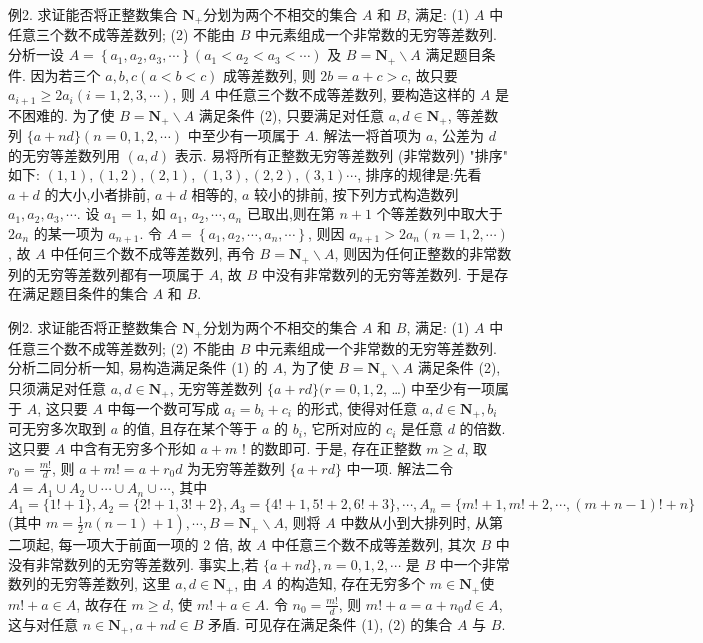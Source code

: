 例2. 求证能否将正整数集合 $\mathbf{N}_{+}$分划为两个不相交的集合 $A$ 和 $B$, 满足:
(1) $A$ 中任意三个数不成等差数列;
(2) 不能由 $B$ 中元素组成一个非常数的无穷等差数列.
分析一设 $A=\left\{a_1, a_2, a_3, \cdots\right\}\left(a_1<a_2<a_3<\cdots\right)$ 及 $B=\mathbf{N}_{+} \backslash A$ 满足题目条件.
因为若三个 $a, b, c(a<b<c)$ 成等差数列, 则 $2 b=a+c>c$, 故只要 $a_{i+1} \geqslant 2 a_i(i=1,2,3, \cdots)$, 则 $A$ 中任意三个数不成等差数列, 要构造这样的 $A$ 是不困难的.
为了使 $B=\mathbf{N}_{+} \backslash A$ 满足条件 (2), 只要满足对任意 $a, d \in \mathbf{N}_{+}$, 等差数列 $\{a+n d\}(n=0,1,2, \cdots)$ 中至少有一项属于 $A$.
解法一将首项为 $a$, 公差为 $d$ 的无穷等差数列用 $(a, d)$ 表示.
易将所有正整数无穷等差数列 (非常数列) "排序" 如下: $(1,1),(1,2),(2,1)$, $(1,3),(2,2),(3,1) \cdots$, 排序的规律是:先看 $a+d$ 的大小,小者排前, $a+d$ 相等的, $a$ 较小的排前, 按下列方式构造数列 $a_1, a_2, a_3, \cdots$. 设 $a_1=1$, 如 $a_1$, $a_2, \cdots, a_n$ 已取出,则在第 $n+1$ 个等差数列中取大于 $2 a_n$ 的某一项为 $a_{n+1}$.
令 $A=\left\{a_1, a_2, \cdots, a_n, \cdots\right\}$, 则因 $a_{n+1}>2 a_n(n=1,2, \cdots)$, 故 $A$ 中任何三个数不成等差数列, 再令 $B=\mathbf{N}_{+} \backslash A$, 则因为任何正整数的非常数列的无穷等差数列都有一项属于 $A$, 故 $B$ 中没有非常数列的无穷等差数列.
于是存在满足题目条件的集合 $A$ 和 $B$.



例2. 求证能否将正整数集合 $\mathbf{N}_{+}$分划为两个不相交的集合 $A$ 和 $B$, 满足:
(1) $A$ 中任意三个数不成等差数列;
(2) 不能由 $B$ 中元素组成一个非常数的无穷等差数列.
分析二同分析一知, 易构造满足条件 (1) 的 $A$, 为了使 $B=\mathbf{N}_{+} \backslash A$ 满足条件 (2), 只须满足对任意 $a, d \in \mathbf{N}_{+}$, 无穷等差数列 $\{a+r d\}(r=0,1,2$, …) 中至少有一项属于 $A$, 这只要 $A$ 中每一个数可写成 $a_i=b_i+c_i$ 的形式, 使得对任意 $a, d \in \mathbf{N}_{+}, b_i$ 可无穷多次取到 $a$ 的值, 且存在某个等于 $a$ 的 $b_i$, 它所对应的 $c_i$ 是任意 $d$ 的倍数.
这只要 $A$ 中含有无穷多个形如 $a+m$ ! 的数即可.
于是, 存在正整数 $m \geqslant d$, 取 $r_0=\frac{m !}{d}$, 则 $a+m !=a+r_0 d$ 为无穷等差数列 $\{a+r d\}$ 中一项.
解法二令 $A=A_1 \cup A_2 \cup \cdots \cup A_n \cup \cdots$, 其中 $A_1=\{1 !+1\}, A_2= \{2 !+1,3 !+2\}, A_3=\{4 !+1,5 !+2,6 !+3\}, \cdots, A_n=\{m !+1, m !+ 2, \cdots,(m+n-1) !+n\}$ (其中 $\left.m=\frac{1}{2} n(n-1)+1\right), \cdots, B=\mathbf{N}_{+} \backslash A$, 则将 $A$ 中数从小到大排列时, 从第二项起, 每一项大于前面一项的 2 倍, 故 $A$ 中任意三个数不成等差数列, 其次 $B$ 中没有非常数列的无穷等差数列.
事实上,若 $\{a+n d\}, n=0,1,2, \cdots$ 是 $B$ 中一个非常数列的无穷等差数列, 这里 $a, d \in \mathbf{N}_{+}$, 由 $A$ 的构造知, 存在无穷多个 $m \in \mathbf{N}_{+}$使 $m !+a \in A$, 故存在 $m \geqslant d$, 使 $m !+a \in A$. 令 $n_0=\frac{m !}{d}$, 则 $m !+a=a+n_0 d \in A$, 这与对任意 $n \in \mathbf{N}_{+}, a+n d \in B$ 矛盾.
可见存在满足条件 (1), (2) 的集合 $A$ 与 $B$.



